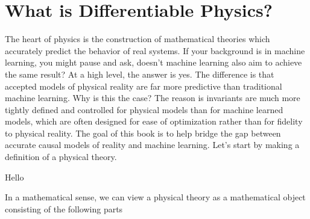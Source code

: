 \documentclass[book.tex]{subfiles}
\begin{document}
\chapter{What is Differentiable Physics?}
\label{ch:intro} 
The heart of physics is the construction of mathematical theories which accurately predict the behavior of real systems. If your background is in machine learning, you might pause and ask, doesn't machine learning also aim to achieve the same result? At a high level, the answer is yes. The difference is that accepted models of physical reality are far more predictive than traditional machine learning. Why is this the case? The reason is invariants are much more tightly defined and controlled for physical models than for machine learned models, which are often designed for ease of optimization rather than for fidelity to physical reality. The goal of this book is to help bridge the gap between accurate causal models of reality and machine learning. Let's start by making a definition of a physical theory.

Hello

In a mathematical sense, we can view a physical theory as a mathematical object consisting of the following parts
\end{document}

